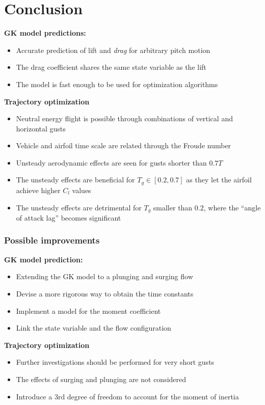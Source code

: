 \documentclass[compress]{beamer}
\begin{document}
\section{Conclusion}
\begin{frame}
  \textbf{GK model predictions:}
  \begin{itemize}
    \item Accurate prediction of lift and \emph{drag} for arbitrary pitch motion
    \item The drag coefficient shares the same state variable as the lift 
    \item The model is fast enough to be used for optimization algorithms
  \end{itemize}
  \textbf{Trajectory optimization}
  \begin{itemize}
    \item Neutral energy flight is possible through combinations of vertical and horizontal gusts
    \item Vehicle and airfoil time scale are related through the Froude number
    \item Unsteady aerodynamic effects are seen for gusts shorter than $0.7T$
    \item The unsteady effects are beneficial for $T_g \in [0.2,0.7]$ as they let the airfoil achieve higher $C_l$ values
    \item The unsteady effects are detrimental for $T_g$ smaller than $0.2$, where the ``angle of attack lag'' becomes significant
  \end{itemize}
\end{frame}

\begin{frame}
  \frametitle{Possible improvements}
  \textbf{GK model prediction:}
  \begin{itemize}
    \item Extending the GK model to a plunging and surging flow
    \item Devise a more rigorous way to obtain the time constants
    \item Implement a model for the moment coefficient
    \item Link the state variable and the flow configuration
  \end{itemize}
  \textbf{Trajectory optimization}
  \begin{itemize}
    \item Further investigations should be performed for very short gusts
    \item The effects of surging and plunging are not considered
    \item Introduce a 3rd degree of freedom to account for the moment of inertia
  \end{itemize}
\end{frame}
\end{document}

